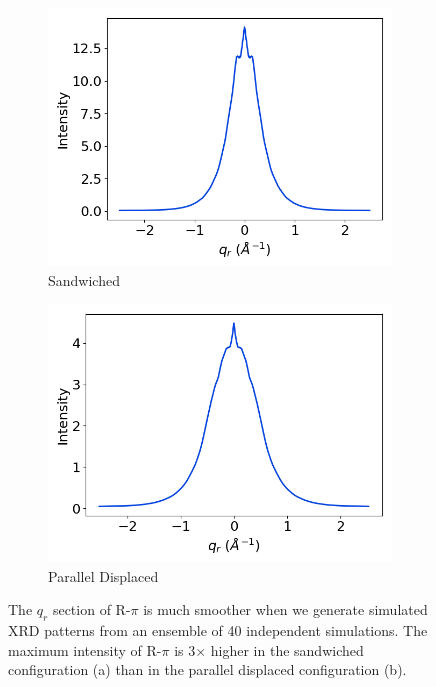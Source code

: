 \documentclass[journal=jpcbfk,manuscript=article]{achemso}
\begin{document}
  \begin{figure}[!htb]
  \centering
  \begin{subfigure}{0.45\textwidth}
  \includegraphics[width=\textwidth]{sandwiched_ensemble_rsection.png}
  \caption{Sandwiched}\label{fig:sandwiched_ensemble_rsection}
  \end{subfigure}
  \begin{subfigure}{0.45\textwidth}
  \includegraphics[width=\textwidth]{offset_ensemble_rsection.png}
  \caption{Parallel Displaced}\label{fig:offset_ensemble_rsection}
  \end{subfigure}
  \caption{The $q_r$ section of R-$\pi$ is much smoother when we generate simulated XRD
  		   patterns from an ensemble of 40 independent simulations. The maximum 
  		   intensity of R-$\pi$ is 3$\times$ higher in the sandwiched configuration (a)
  		   than in the parallel displaced configuration (b).}\label{fig:ensemble_XRD}
  \end{figure}
  
\end{document}
